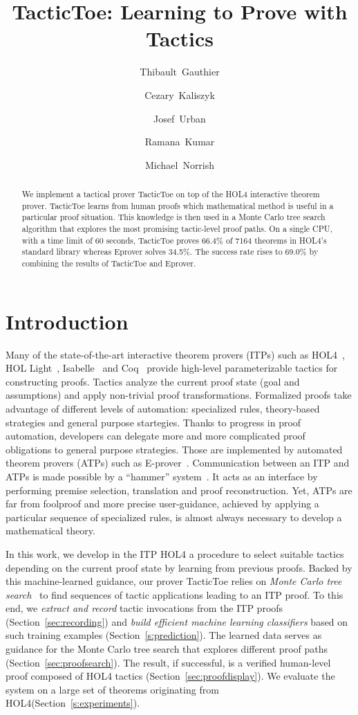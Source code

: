 \documentclass[runningheads,a4paper,draft]{svjour3}
\title{TacticToe: Learning to Prove with Tactics}
\author{\mbox{Thibault Gauthier} \and \mbox{Cezary Kaliszyk} \and \mbox{Josef
Urban} \and \mbox{Ramana Kumar} \and \mbox{Michael Norrish}}
\institute{Thibault Gauthier and Cezary Kaliszyk \at
Department of Computer Science, University of Innsbruck,
Innsbruck, Austria\\ \url{{thibault.gauthier,cezary.kaliszyk}@uibk.ac.at}
\and
Josef Urban \at Czech Technical University, Prague\\\url{josef.urban@gmail.com}
\and Ramana Kumar and Michael Norrish \at Data61}
\def\holfour{\textsf{HOL4}\xspace}
\def\isabelle{\textsf{Isabelle}\xspace}
\def\hollight{\textsf{HOL Light}\xspace}
\def\coq{\textsf{Coq}\xspace}
\def\eprover{\textsf{E-prover}\xspace}
\def\tactictoe{\textsf{TacticToe}\xspace}
\begin{document}
\maketitle

\begin{abstract}
We implement a tactical prover TacticToe on top of the HOL4 interactive theorem
prover. TacticToe learns from human proofs which mathematical method is
useful in a particular proof situation.
This knowledge is then used in a Monte Carlo tree search algorithm that
explores the most promising tactic-level proof paths.
On a single CPU, with a time limit of 60 seconds, TacticToe proves 66.4\% of
7164 theorems in HOL4's standard library whereas
Eprover solves 34.5\%. The success rate rises to 69.0\% by combining the
results of TacticToe and Eprover.
\end{abstract}

\tableofcontents

\section{Introduction}
Many of the state-of-the-art interactive theorem provers (ITPs) such as
  \holfour~\cite{hol4}, \hollight~\cite{Harrison09hollight},
  \isabelle~\cite{isabelle}
  and \coq~\cite{coq-book} provide high-level parameterizable tactics for constructing proofs.
  Tactics analyze the current proof state (goal and
  assumptions) and apply non-trivial proof transformations.
  Formalized proofs take advantage of different levels of automation:
  specialized rules, theory-based strategies and general purpose startegies.
  Thanks to progress in proof
  automation, developers can delegate more and more complicated proof
  obligations to general purpose strategies. Those are implemented by automated
  theorem provers (ATPs) such as \eprover~\cite{eprover}. Communication
  between
  an ITP and ATPs is made possible by a ``hammer''
  system~\cite{hammers4qed,tgck-cpp15}. It acts as an interface by performing
  premise selection, translation and proof reconstruction.
  Yet, ATPs are far from foolproof and more precise user-guidance, achieved
  by applying a particular sequence of specialized rules, is almost always
  necessary to develop a mathematical theory.

  In this work, we develop in the ITP \holfour a procedure to select suitable
  tactics depending on the current proof state by learning
  from previous proofs. Backed by this machine-learned guidance, our prover
  \tactictoe relies on \emph{Monte
  Carlo tree search}~\cite{montecarlo} to find sequences of tactic applications
  leading to an ITP proof.
  To this end, we \emph{extract and record} tactic invocations from the ITP
  proofs (Section~\ref{sec:recording}) and
  \emph{build efficient machine learning classifiers} based on such training
  examples (Section~\ref{s:prediction}).  The learned data serves as
  guidance for the Monte Carlo tree search that explores different
  proof paths (Section~\ref{sec:proofsearch}). The result, if
  successful, is a verified human-level proof composed of \holfour
  tactics (Section~\ref{sec:proofdisplay}). We evaluate the system on a large
  set of theorems originating
  from \holfour (Section~\ref{s:experiments}).
\end{document}
